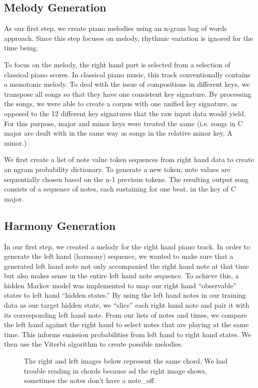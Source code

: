 \documentclass{article}
\begin{document}
\subsection{Melody Generation}
As our first step, we create piano melodies using an n-gram bag of words approach. Since this step focuses on melody, rhythmic variation is ignored for the time being. 
\par To focus on the melody, the right hand part is selected from a selection of classical piano scores. In classical piano music, this track conventionally contains a monotonic melody. To deal with the issue of compositions in different keys, we transpose all songs so that they have one consistent key signature. By processing the songs, we were able to create a corpus with one unified key signature, as opposed to the 12 different key signatures that the raw input data would yield. For this purpose, major and minor keys were treated the same (i.e. songs in C major are dealt with in the same way as songs in the relative minor key, A minor.) 
\par We first create a list of note value token sequences from right hand data to create an ngram probability dictionary. To generate a new token, note values are sequentially chosen based on the n-1 previous tokens. The resulting output song consists of a sequence of notes, each sustaining for one beat, in the key of C major.


\subsection{Harmony Generation}
In our first step, we created a melody for the right hand piano track. In order to generate the left hand (harmony) sequence, we wanted to make sure that a generated left hand note not only accompanied the right hand note at that time but also makes sense in the entire left hand note sequence.  To achieve this, a hidden Markov model was implemented to map our right hand “observable” states to left hand “hidden states.”  By using the left hand notes in our training data as our target hidden state, we “slice” each right hand note and pair it with its corresponding left hand note. From our lists of notes and times, we compare the left hand against the right hand to select notes that are playing at the same time. This informs emission probabilities from left hand to right hand states. We then use the Viterbi algorithm to create possible melodies. 

\begin{figure}[ht]
\centering
{}
\caption{The right and left images below represent the same chord. We had trouble reading in chords because ad the right image shows, sometimes the notes don't have a note\_off.}
\end{figure}
\end{document}
